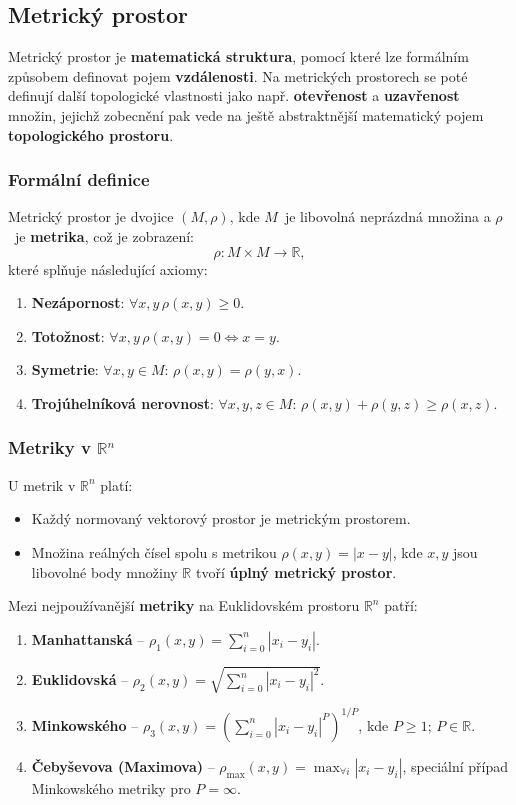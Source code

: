 \subsection{Metrický prostor}
Metrický prostor je \textbf{matematická struktura}, pomocí které lze formálním způsobem definovat pojem \textbf{vzdálenosti}. Na metrických prostorech se poté definují další topologické vlastnosti jako např. \textbf{otevřenost} a \textbf{uzavřenost} množin, jejichž zobecnění pak vede na ještě abstraktnější matematický pojem \textbf{topologického prostoru}.

\subsubsection{Formální definice}
Metrický prostor je dvojice $(M, \rho)$, kde $M$ je libovolná neprázdná množina a $\rho$ je \textbf{metrika}, což je zobrazení:
\begin{equation*}
\rho: M \times M \rightarrow \mathbb{R},
\end{equation*}
které splňuje následující axiomy:
\begin{enumerate}
\item \textbf{Nezápornost}: $\forall x, y \, \rho(x, y) \geq 0$.
\item \textbf{Totožnost}: $\forall x, y \, \rho (x, y)  = 0 \Leftrightarrow x = y$.
\item \textbf{Symetrie}: $\forall x, y \in M: \, \rho(x, y) = \rho(y,x)$.
\item \textbf{Trojúhelníková nerovnost}: $\forall x, y, z \in M: \, \rho(x, y) + \rho(y,z) \geq \rho(x, z)$.
\end{enumerate}

\subsubsection{Metriky v $\mathbb{R}^n$}
U metrik v $\mathbb{R}^n$ platí:
\begin{itemize}
\item Každý normovaný vektorový prostor je metrickým prostorem.
\item Množina reálných čísel spolu s metrikou $\rho(x, y) = |x - y|$, kde $x, y$ jsou libovolné body množiny $\mathbb{R}$ tvoří \textbf{úplný metrický prostor}.
\end{itemize}
Mezi nejpoužívanější \textbf{metriky} na Euklidovském prostoru $\mathbb{R}^n$ patří:
\begin{enumerate}
\item \textbf{Manhattanská} -- $\rho_1(x, y) = \sum_{i = 0}^n |x_i - y_i|$.
\item \textbf{Euklidovská} -- $\rho_2(x, y) = \sqrt{\sum_{i = 0}^n |x_i - y_i|^2}$.
\item \textbf{Minkowského} -- $\rho_3(x, y) = (\sum_{i = 0}^n |x_i - y_i|^P)^{1/P}$, kde $P \geq 1; \, P \in \mathbb{R}$.
\item \textbf{Čebyševova (Maximova)} -- $\rho_{\max}(x, y) = \max_{\forall i} |x_i - y_i|$, speciální případ Minkowského metriky pro $P = \infty$.
\end{enumerate}

